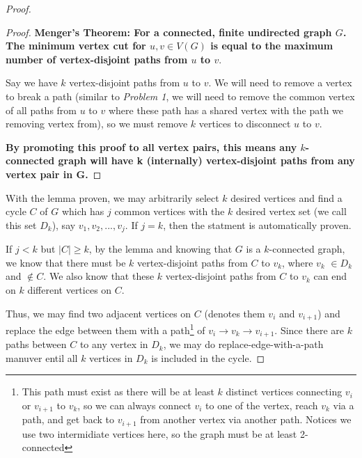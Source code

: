 \documentclass[11pt]{article}
\begin{document}
\begin{proof}

\leavevmode\newline


    \begin{adjustwidth}{1cm}{}

    \begin{proof}
    \textbf{Menger's Theorem: For a connected, finite undirected graph $G$. The minimum vertex cut for $u, v \in V(G)$ is equal to the maximum number of vertex-disjoint paths from $u$ to $v$}.\newline

    Say we have $k$ vertex-disjoint paths from $u$ to $v$. We will need to remove a vertex to break a path (similar to \textit{Problem 1}, we will need to remove the common vertex of all paths from $u$ to $v$ where these path has a shared vertex with the path we removing vertex from), so we must remove $k$ vertices to disconnect $u$ to $v$.

    \textbf{By promoting this proof to all vertex pairs, this means any $k$-connected graph will have k (internally) vertex-disjoint paths from any vertex pair in G.}


    \end{proof}

    \end{adjustwidth}

With the lemma proven, we may arbitrarily select $k$ desired vertices and find a cycle $C$ of $G$ which has $j$ common vertices with the $k$ desired vertex set (we call this set $D_k$), say $v_1, v_2, ..., v_j$. If $j = k$, then the statment is automatically proven. \newline

If $j < k$ but $|C| \geq k$, by the lemma and knowing that $G$ is a $k$-connected graph, we know that there must be $k$ vertex-disjoint paths from $C$ to $v_k$, where $v_k$ $\in D_k$ and $\not \in C$. We also know that these $k$ vertex-disjoint paths from $C$ to $v_k$ can end on $k$ different vertices on $C$.

Thus, we may find two adjacent vertices on $C$ (denotes them $v_i$ and $v_{i+1}$) and replace the edge between them with a path\footnote{This path must exist as there will be at least $k$ distinct vertices connecting $v_{i}$ or $v_{i+1}$ to $v_k$, so we can always connect $v_i$ to one of the vertex, reach $v_k$ via a path, and get back to $v_{i+1}$ from another vertex via another path. Notices we use two intermidiate vertices here, so the graph must be at least 2-connected} of $v_{i} \to v_k \to v_{i+1}$. Since there are $k$ paths between $C$ to any vertex in $D_k$, we may do replace-edge-with-a-path manuver entil all $k$ vertices in $D_k$ is included in the cycle.


\end{proof}
\end{document}

